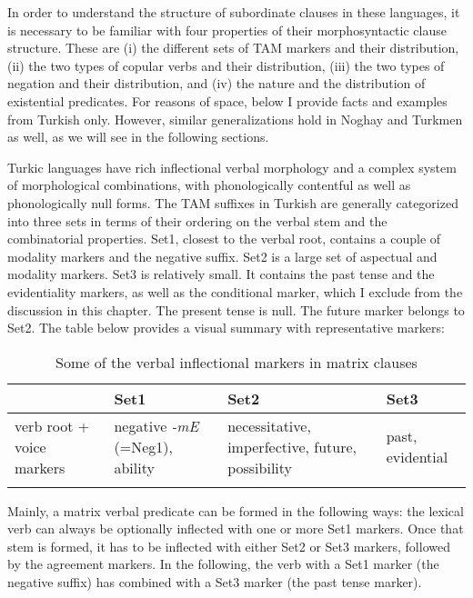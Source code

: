 \documentclass[output=paper]{langsci/langscibook}
\begin{document}
In order to understand the structure of subordinate clauses in these languages, 
it is necessary to be familiar with four properties of their morphosyntactic clause structure. 
These are 
(i) the different sets of TAM markers and their distribution, 
(ii) the two types of copular verbs and their distribution, 
(iii) the two types of negation and their distribution, and 
(iv) the nature and the distribution of existential predicates. 
For reasons of space, below I provide facts and examples from Turkish only. 
However, similar generalizations hold in Noghay and Turkmen as well, as we will see in the following sections.

Turkic languages have rich inflectional verbal morphology and a complex system of morphological combinations, 
with phonologically contentful as well as phonologically null forms. 
The TAM suffixes in Turkish are generally categorized into three sets in terms of their ordering on the verbal stem and the combinatorial properties. 
Set1, closest to the verbal root, contains a couple of modality markers and the negative suffix. 
Set2 is a large set of aspectual and modality markers. 
Set3 is relatively small. 
It contains the past tense and the evidentiality markers, as well as the conditional marker, which I exclude from the discussion in this chapter. 
The present tense is null. 
The future marker belongs to Set2. 
The table below provides a visual summary with representative markers:

\begin{table}
    \begin{tabularx}{\textwidth}{QQQQ}
        \lsptoprule
        {} & {Set1} & {Set2} & {Set3} \\
        \midrule
        verb root \newline + voice markers & 
        negative \textit{-mE} \newline (=Neg1), \newline ability &
        necessitative, \newline imperfective, \newline future, \newline possibility &
        past, \newline evidential \\
        \lspbottomrule
    \end{tabularx}
    \caption{Some of the verbal inflectional markers in matrix clauses}
    \label{kelepirtab:key:1}
\end{table}

Mainly, a matrix verbal predicate can be formed in the following ways: 
the lexical verb can always be optionally inflected with one or more Set1 markers. 
Once that stem is formed, it has to be inflected with either Set2 or Set3 markers, followed by the agreement markers. 
In the following, the verb with a Set1 marker (the negative suffix) has combined with a Set3 marker (the past tense marker).
\end{document}
